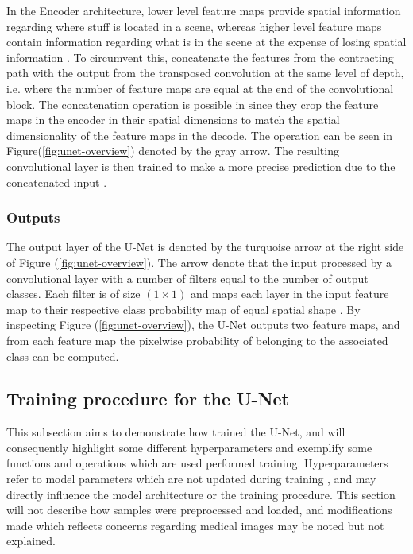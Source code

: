 \documentclass[../main/thesis.tex]{subfiles}
\begin{document}
In the Encoder architecture, lower level feature maps provide spatial information regarding where stuff is located in a scene, whereas higher level feature maps contain information regarding what is in the scene at the expense of losing spatial information \citep{Long2015}. To circumvent this, \citet{Ronneberger2015} concatenate the features from the contracting path with the output from the transposed convolution at the same level of depth, i.e. where the number of feature maps are equal at the end of the convolutional block. The concatenation operation is possible in \citet{Ronneberger2015} since they crop the feature maps in the encoder in their spatial dimensions to match the spatial dimensionality of the feature maps in the decode. The operation can be seen in Figure(\ref{fig:unet-overview}) denoted by the gray arrow. The resulting convolutional layer is then trained to make a more precise prediction due to the concatenated input \citep{Ronneberger2015}.

\subsubsection{Outputs}
The output layer of the U-Net is denoted by the turquoise arrow at the right side of Figure (\ref{fig:unet-overview}). The arrow denote that the input processed by a convolutional layer with a number of filters equal to the number of output classes. Each filter is of size $(1 \times 1)$ and maps each layer in the input feature map to their respective class probability map of equal spatial shape \citep{Ronneberger2015}. By inspecting Figure (\ref{fig:unet-overview}), the U-Net outputs two feature maps, and from each feature map the pixelwise probability of belonging to the associated class can be computed.

\subsection{Training procedure for the U-Net}
This subsection aims to demonstrate how \citet{Ronneberger2015} trained the U-Net, and will consequently highlight some different hyperparameters and exemplify some functions and operations which are used performed training. Hyperparameters refer to model parameters which are not updated during training \citep{Yu2020a}, and may directly influence the model architecture or the training procedure. This section will not describe how samples were preprocessed and loaded, and modifications made which reflects concerns regarding medical images may be noted but not explained.
\end{document}
